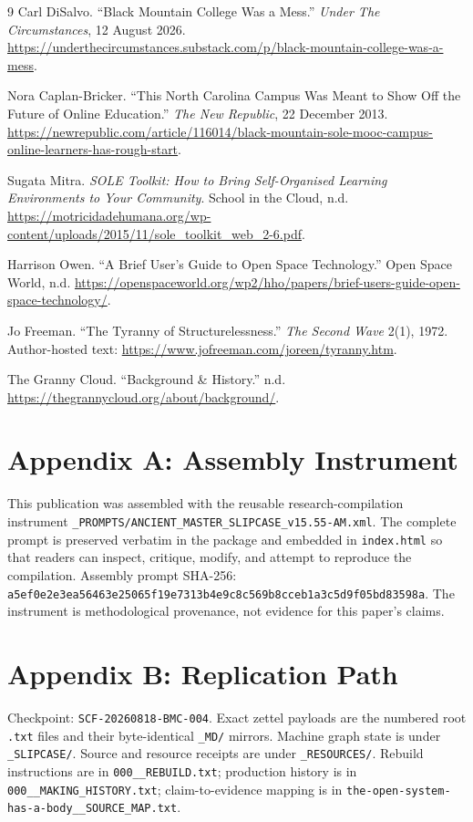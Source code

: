\documentclass[11pt]{article}
\begin{document}
\begin{thebibliography}{9}
 Carl DiSalvo. ``Black Mountain College Was a Mess.'' \emph{Under The Circumstances}, 12 August 2026. \url{https://underthecircumstances.substack.com/p/black-mountain-college-was-a-mess}.

 Nora Caplan-Bricker. ``This North Carolina Campus Was Meant to Show Off the Future of Online Education.'' \emph{The New Republic}, 22 December 2013. \url{https://newrepublic.com/article/116014/black-mountain-sole-mooc-campus-online-learners-has-rough-start}.

 Sugata Mitra. \emph{SOLE Toolkit: How to Bring Self-Organised Learning Environments to Your Community}. School in the Cloud, n.d. \url{https://motricidadehumana.org/wp-content/uploads/2015/11/sole_toolkit_web_2-6.pdf}.

 Harrison Owen. ``A Brief User's Guide to Open Space Technology.'' Open Space World, n.d. \url{https://openspaceworld.org/wp2/hho/papers/brief-users-guide-open-space-technology/}.

 Jo Freeman. ``The Tyranny of Structurelessness.'' \emph{The Second Wave} 2(1), 1972. Author-hosted text: \url{https://www.jofreeman.com/joreen/tyranny.htm}.

 The Granny Cloud. ``Background \& History.'' n.d. \url{https://thegrannycloud.org/about/background/}.
\end{thebibliography}

\section*{Appendix A: Assembly Instrument}
This publication was assembled with the reusable research-compilation instrument \nolinkurl{_PROMPTS/ANCIENT_MASTER_SLIPCASE_v15.55-AM.xml}. The complete prompt is preserved verbatim in the package and embedded in \nolinkurl{index.html} so that readers can inspect, critique, modify, and attempt to reproduce the compilation. Assembly prompt SHA-256: \texttt{a5ef0e2e3ea56463e25065f19e7313b4}\allowbreak\texttt{e9c8c569b8cceb1a3c5d9f05bd83598a}. The instrument is methodological provenance, not evidence for this paper's claims.

\section*{Appendix B: Replication Path}
Checkpoint: \nolinkurl{SCF-20260818-BMC-004}. Exact zettel payloads are the numbered root \nolinkurl{.txt} files and their byte-identical \nolinkurl{_MD/} mirrors. Machine graph state is under \nolinkurl{_SLIPCASE/}. Source and resource receipts are under \nolinkurl{_RESOURCES/}. Rebuild instructions are in \nolinkurl{000__REBUILD.txt}; production history is in \nolinkurl{000__MAKING_HISTORY.txt}; claim-to-evidence mapping is in \nolinkurl{the-open-system-has-a-body__SOURCE_MAP.txt}.
\end{document}
